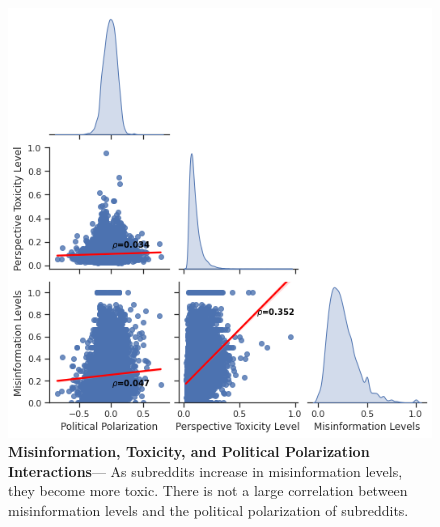 \begin{figure}
\begin{minipage}[l]{0.3\textwidth}
\includegraphics[width=1\columnwidth]{figures/subreddit_distribution.png} 
\end{minipage}
\begin{minipage}[l]{0.3\textwidth}
\caption{\textbf{Misinformation, Toxicity, and Political Polarization Interactions}--- As subreddits increase in misinformation levels, they become more toxic. There is not a large correlation between misinformation levels and the political polarization of subreddits.}
\end{minipage}
\label{figure:subreddit_interaction}
\end{figure}


